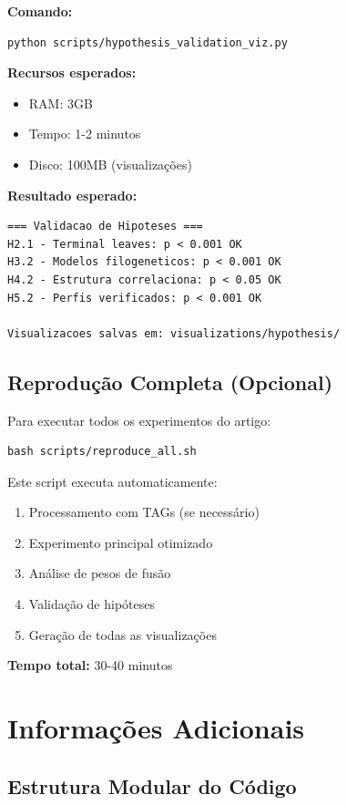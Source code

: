 \documentclass[12pt]{article}
\begin{document}
\textbf{Comando:}
\begin{verbatim}
python scripts/hypothesis_validation_viz.py
\end{verbatim}

\textbf{Recursos esperados:}
\begin{itemize}
    \item RAM: 3GB
    \item Tempo: 1-2 minutos
    \item Disco: 100MB (visualiza\c{c}\~oes)
\end{itemize}

\textbf{Resultado esperado:}
\begin{verbatim}
=== Validacao de Hipoteses ===
H2.1 - Terminal leaves: p < 0.001 OK
H3.2 - Modelos filogeneticos: p < 0.001 OK
H4.2 - Estrutura correlaciona: p < 0.05 OK
H5.2 - Perfis verificados: p < 0.001 OK

Visualizacoes salvas em: visualizations/hypothesis/
\end{verbatim}

\subsection{Reprodu\c{c}\~ao Completa (Opcional)}

Para executar todos os experimentos do artigo:

\begin{verbatim}
bash scripts/reproduce_all.sh
\end{verbatim}

Este script executa automaticamente:
\begin{enumerate}
    \item Processamento com TAGs (se necess\'ario)
    \item Experimento principal otimizado
    \item An\'alise de pesos de fus\~ao
    \item Valida\c{c}\~ao de hip\'oteses
    \item Gera\c{c}\~ao de todas as visualiza\c{c}\~oes
\end{enumerate}

\textbf{Tempo total:} 30-40 minutos

\section{Informa\c{c}\~oes Adicionais}

\subsection{Estrutura Modular do C\'odigo}
\end{document}
